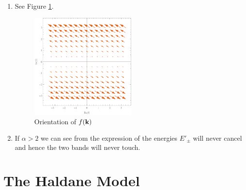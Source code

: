 \documentclass[10pt,a4paper]{article}
\begin{document}
\begin{enumerate}
\item See Figure \ref{fkvfield}. 

\begin{figure} 
\centering
\includegraphics[width=0.5\textwidth]{fkvfield}
\caption{Orientation of $f(\vb{k})$} \label{fkvfield}
\end{figure}

\item If $\alpha > 2$ we can see from the expression of the energies $E'_{\pm}$ will never cancel and hence the two bands will never touch.

\end{enumerate}

\section{The Haldane Model}
\end{document}
